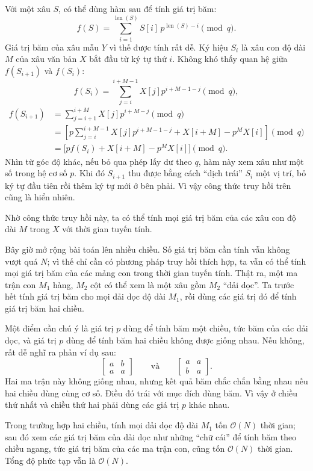 \documentclass[11pt]{article}
\newcommand{\Oh}{\mathcal{O}}
\begin{document}
Với một xâu $S$, có thể dùng hàm sau để tính giá trị băm:
\[
  f(S)=\sum_{i=1}^{\operatorname{len}(S)}
    S[i]\,p^{\operatorname{len}(S)-i}\pmod q.
\]
Giá trị băm của xâu mẫu $Y$ vì thế được tính rất dễ. Ký hiệu $S_i$ là xâu con
độ dài $M$ của xâu văn bản $X$ bắt đầu từ ký tự thứ $i$. Không khó thấy quan
hệ giữa $f(S_{i+1})$ và $f(S_i)$:
\[
  f(S_i)=\sum_{j=i}^{i+M-1} X[j]p^{i+M-1-j}\pmod q,
\]
\[
\begin{aligned}
  f(S_{i+1})
  &=\sum_{j=i+1}^{i+M} X[j]p^{i+M-j}\pmod q\\
  &=\left[
      p\sum_{j=i}^{i+M-1} X[j]p^{i+M-1-j}
      +X[i+M]-p^M X[i]
    \right]\pmod q\\
  &=\bigl[p f(S_i)+X[i+M]-p^M X[i]\bigr]\pmod q.
\end{aligned}
\]
Nhìn từ góc độ khác, nếu bỏ qua phép lấy dư theo $q$, hàm này xem xâu như
một số trong hệ cơ số $p$. Khi đó $S_{i+1}$ thu được bằng cách ``dịch trái''
$S_i$ một vị trí, bỏ ký tự đầu tiên rồi thêm ký tự mới ở bên phải. Vì vậy
công thức truy hồi trên cũng là hiển nhiên.

Nhờ công thức truy hồi này, ta có thể tính mọi giá trị băm của các xâu con
độ dài $M$ trong $X$ với thời gian tuyến tính.

Bây giờ mở rộng bài toán lên nhiều chiều. Số giá trị băm cần tính vẫn không
vượt quá $N$; vì thế chỉ cần có phương pháp truy hồi thích hợp, ta vẫn có thể
tính mọi giá trị băm của các mảng con trong thời gian tuyến tính. Thật ra,
một ma trận con $M_1$ hàng, $M_2$ cột có thể xem là một xâu gồm $M_2$ ``dải
dọc''. Ta trước hết tính giá trị băm cho mọi dải dọc độ dài $M_1$, rồi dùng
các giá trị đó để tính giá trị băm hai chiều.

Một điểm cần chú ý là giá trị $p$ dùng để tính băm một chiều, tức băm của các
dải dọc, và giá trị $p$ dùng để tính băm hai chiều không được giống nhau. Nếu
không, rất dễ nghĩ ra phản ví dụ sau:
\[
\begin{bmatrix}
a & b\\
a & a
\end{bmatrix}
\qquad\text{và}\qquad
\begin{bmatrix}
a & a\\
b & a
\end{bmatrix}.
\]
Hai ma trận này không giống nhau, nhưng kết quả băm chắc chắn bằng nhau nếu
hai chiều dùng cùng cơ số. Điều đó trái với mục đích dùng băm. Vì vậy ở chiều
thứ nhất và chiều thứ hai phải dùng các giá trị $p$ khác nhau.

Trong trường hợp hai chiều, tính mọi dải dọc độ dài $M_1$ tốn $\Oh(N)$ thời
gian; sau đó xem các giá trị băm của dải dọc như những ``chữ cái'' để tính
băm theo chiều ngang, tức giá trị băm của các ma trận con, cũng tốn $\Oh(N)$
thời gian. Tổng độ phức tạp vẫn là $\Oh(N)$.
\end{document}
